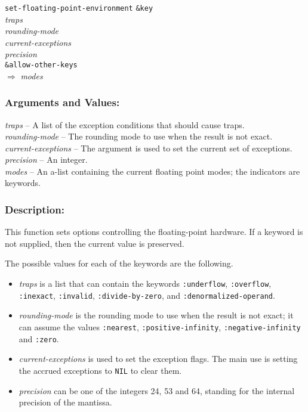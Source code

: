 \documentclass[10pt,fleqn]{article}
\newcommand{\code}[1]{\texttt{#1}}
\newcommand{\varname}[1]{\textit{#1}}
\newcommand{\DArgsNValues}{\subsubsection*{Arguments and Values:}}
\newcommand{\DDescription}{\subsubsection*{Description:}}
\begin{document}
\begin{tabbing}
\code{set-floating-point-environment} \= \code{\&key}\\
\>\varname{traps}\\
\>\varname{rounding-mode}\\
\>\varname{current-exceptions}\\
\>\varname{precision}\\
\>\code{\&allow-other-keys}\\
$\Rightarrow$ \varname{modes}
\end{tabbing}


\DArgsNValues{}

\varname{traps} -- A list of the exception conditions that should cause
traps.\\
\varname{rounding-mode} -- The rounding mode to use when the result is
not exact.\\
\varname{current-exceptions} -- The argument is used to set the current
set of exceptions.\\
\varname{precision} -- An integer.\\
\varname{modes} -- An a-list containing the current floating
point modes; the indicators are keywords.

\DDescription{}

This function sets options controlling the floating-point
hardware. If a keyword is not supplied, then the current value is
preserved.

The possible values for each of the keywords are the
following.

\begin{itemize}
\item \varname{traps} is a list that can contain the keywords
  \code{:underflow}, \code{:overflow}, \code{:inexact}, \code{:invalid},
  \code{:divide-by-zero}, and \code{:denormalized-operand}.

\item \varname{rounding-mode} is the rounding mode to use when the result is
  not exact; it can assume the values \code{:nearest},
  \code{:positive-infinity}, \code{:negative-infinity} and
  \code{:zero}.

\item \varname{current-exceptions} is used to set the exception flags. The
  main use is setting the accrued exceptions to \code{NIL} to clear
  them.

\item \varname{precision} can be one of the integers 24, 53 and 64, standing for
  the internal precision of the mantissa.
\end{itemize}
\end{document}
